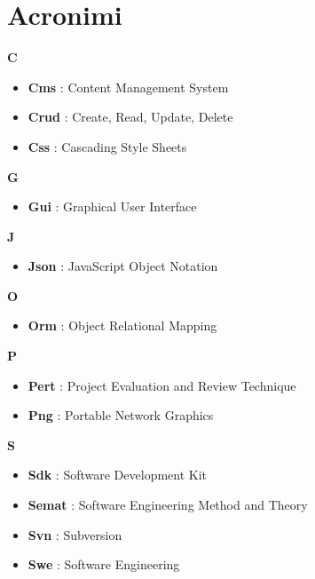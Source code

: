 \section*{Acronimi}
{\huge \textbf{C}}
\begin{flushleft}
\begin{itemize}[label={}]
\item \textbf{Cms} : Content Management System
\item \textbf{Crud} : Create, Read, Update, Delete
\item \textbf{Css} : Cascading Style Sheets
\end{itemize}
\end{flushleft}
{\huge \textbf{G}}
\begin{flushleft}
\begin{itemize}[label={}]
\item \textbf{Gui} : Graphical User Interface
\end{itemize}
\end{flushleft}
{\huge \textbf{J}}
\begin{flushleft}
\begin{itemize}[label={}]
\item \textbf{Json} : JavaScript Object Notation
\end{itemize}
\end{flushleft}
{\huge \textbf{O}}
\begin{flushleft}
\begin{itemize}[label={}]
\item \textbf{Orm} : Object Relational Mapping
\end{itemize}
\end{flushleft}
{\huge \textbf{P}}
\begin{flushleft}
\begin{itemize}[label={}]
\item \textbf{Pert} : Project Evaluation and Review Technique
\item \textbf{Png} : Portable Network Graphics
\end{itemize}
\end{flushleft}
{\huge \textbf{S}}
\begin{flushleft}
\begin{itemize}[label={}]
\item \textbf{Sdk} : Software Development Kit
\item \textbf{Semat} : Software Engineering Method and Theory
\item \textbf{Svn} : Subversion
\item \textbf{Swe} : Software Engineering
\end{itemize}
\end{flushleft}
